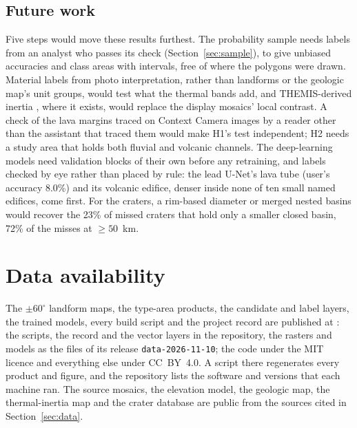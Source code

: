 \subsection{Future work}

Five steps would move these results furthest. The probability sample needs labels from an analyst who passes its
check (Section~\ref{sec:sample}), to give unbiased accuracies and class areas with intervals, free of where the
polygons were drawn. Material labels from photo interpretation, rather than landforms or the geologic map's unit
groups, would test what the thermal bands add, and THEMIS-derived inertia \citep{Fergason2006}, where it exists,
would replace the display mosaics' local contrast. A check of the lava margins traced on Context Camera images
\citep{Malin2007} by a reader other than the assistant that traced them would make H1's test independent; H2 needs a study area that holds both fluvial and
volcanic channels. The deep-learning models need validation blocks of their own before any retraining, and labels
checked by eye rather than placed by rule: the lead U-Net's lava tube (user's accuracy 8.0\%) and its volcanic
edifice, denser inside none of ten small named edifices, come first. For the craters, a rim-based diameter or merged
nested basins would recover the 23\% of missed craters that hold only a smaller closed basin, 72\% of the
misses at $\ge50$~km.

\section*{Data availability}

The $\pm60^{\circ}$ landform maps, the type-area products, the candidate and label layers, the trained models, every
build script and the project record are published at \citet{Edwards2026data}: the scripts, the record and the vector
layers in the repository, the rasters and models as the files of its release \texttt{data-2026-11-10}; the code under
the MIT licence and everything else under CC~BY~4.0. A script there regenerates every product and figure, and the
repository lists the software and versions that each machine ran. The source mosaics, the elevation model, the
geologic map, the thermal-inertia map and the crater database are public from the sources cited in
Section~\ref{sec:data}.

